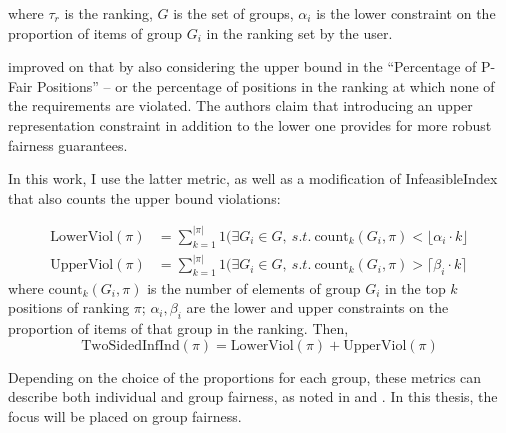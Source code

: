 where $\tau_r$ is the ranking, $G$ is the set of groups, $\alpha_i$ is the lower constraint on the proportion of items of group $G_i$ in the ranking set by the user.

\cite{RAPF} improved on that by also considering the upper bound in the “Percentage of P-Fair Positions” – or the percentage of positions in the ranking at which none of the requirements are violated. The authors claim that introducing an upper representation constraint in addition to the lower one provides for more robust fairness guarantees.

In this work, I use the latter metric, as well as a modification of InfeasibleIndex that also counts the upper bound violations:

\begin{align*}
    \text{LowerViol}(\pi) & = \sum_{k=1}^{|\pi|} 1{(\exists G_i \in G, ~s.t. ~ \text{count}_k(G_i, \pi) < \lfloor \alpha_i \cdot k\rfloor} \\
%
\text{UpperViol}(\pi) &= \sum_{k =1}^{|\pi|} 1{(\exists G_i \in G, ~s.t. ~ \text{count}_k(G_i, \pi) > \lceil \beta_i \cdot k\rceil}\,
\end{align*}
%
where $\text{count}_k(G_i, \pi)$ is the number of elements of group $G_i$ in the top $k$ positions of ranking $\pi$; $\alpha_i, \beta_i$ are the lower and upper constraints on the proportion of items of that group in the ranking. Then,  %
\[
\text{TwoSidedInfInd}(\pi) = \text{LowerViol}(\pi) + \text{UpperViol}(\pi) 
\]

Depending on the choice of the proportions for each group, these metrics can describe both individual and group fairness, as noted in \cite{linkedin} and \cite{RAPF}. In this thesis, the focus will be placed on group fairness.







